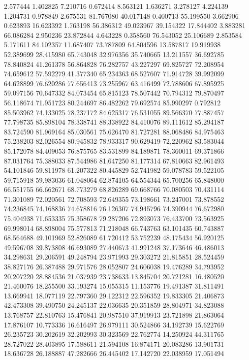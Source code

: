 2.577444
1.402825
7.210716
0.672414
8.563121
1.636271
3.278127
4.224139
1.204731
0.978849
2.675531
81.767080
40.017148
0.400713
55.199550
3.662906
0.623893
16.623392
1.763198
56.386312
49.023967
39.154322
17.844402
3.883281
66.086284
2.950236
23.872844
4.643228
0.358560
76.543052
25.106689
2.853584
5.171611
84.102357
11.687407
73.787809
64.804596
13.587817
19.919938
52.389699
28.415980
65.743048
32.976356
35.740665
13.211557
36.692785
78.840824
41.261378
56.864828
76.282757
43.227297
69.825727
72.208954
74.659612
57.592279
41.377340
65.234363
68.527607
71.914728
39.992099
64.628899
76.620286
77.656413
73.255967
63.416499
72.788606
67.895925
59.097156
70.647332
84.073454
65.815123
78.507442
70.794312
79.870497
56.118674
71.951723
80.244697
86.482262
79.692574
85.990297
0.792812
85.503962
74.133025
78.237172
84.625317
76.531055
89.566370
77.887457
77.798735
85.898104
78.338741
88.338922
84.410076
89.111612
85.294187
83.724590
81.969164
85.030561
75.626470
81.727281
88.068486
84.975463
75.238203
82.026554
80.945832
78.933317
90.629419
72.220962
83.583044
85.172078
84.409053
76.875765
83.531899
84.189871
78.360011
69.371866
87.031764
75.388033
87.544986
81.647250
81.177314
67.810663
82.961493
54.101846
59.811978
61.207322
80.445829
52.741982
59.078783
59.522105
59.715918
59.983036
61.048064
62.874105
64.554344
65.700256
65.848000
66.551755
66.662671
68.773279
68.826289
69.668766
70.080503
70.431114
71.301089
72.020561
72.708593
72.649355
73.198661
73.247001
73.878552
74.236845
74.168836
74.678816
76.126307
74.945796
74.390944
76.672980
75.404938
71.653335
75.358678
79.287206
72.893073
76.433700
73.563925
69.998014
68.898004
75.577813
71.218048
66.743763
63.101435
60.743887
68.564688
49.101969
52.826089
61.720412
53.752239
48.175434
56.920125
49.596708
39.873808
46.693089
27.440673
41.991248
37.173646
46.486013
34.298631
29.206591
49.248794
23.971993
29.303272
21.815851
28.524459
38.827176
26.387488
29.971576
28.052807
24.606038
19.476289
34.793952
20.207220
28.884536
21.037939
23.738633
13.845704
20.721281
16.480520
21.460076
18.255500
33.193274
15.055315
11.153776
19.491387
31.811491
13.669941
18.077119
22.797360
29.122312
22.596352
19.833305
21.406873
42.473308
39.490750
24.245137
22.036635
20.351859
28.804971
34.823088
13.768757
22.810763
15.476841
20.987510
37.919913
23.721898
21.863064
17.876107
10.773336
16.616497
26.979111
30.524866
34.192739
15.622769
26.235723
30.202619
32.202993
30.323569
22.762774
14.250924
44.311765
28.727022
28.403895
17.588611
21.594108
16.874171
20.083286
13.901731
18.636728
26.188887
47.282666
26.445402
17.142720
22.038959
17.051494
